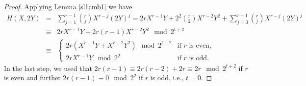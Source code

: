 \documentclass[11pt, reqno]{amsart}
\numberwithin{equation}{section}
\theoremstyle{definition}
\theoremstyle{remark}
\theoremstyle{definition}
\theoremstyle{remark}
\theoremstyle{remark}
\begin{document}
\begin{proof}
Applying Lemma \ref{sl1cmb1} we have 
\begin{eqnarray*}
    H(X,2Y)&=& \sum_{j=1}^{r-1}{r \choose j}X^{r-j}(2Y)^{j} = 2rX^{r-1}Y+ 2^2{r\choose 2}X^{r-2}Y^2+\sum_{j=3}^{r-1}{r \choose j}X^{r-j}(2Y)^{j}\\
    &\equiv & 2rX^{r-1}Y+ 2r(r-1)X^{r-2}Y^2 \mod2^{t+2}\\
    &\equiv& \begin{cases}
        2r(X^{r-1}Y+X^{r-2}Y^2)\mod 2^{t+2} & \text{if } r \text{ is even,}\\
        2rX^{r-1}Y \mod2^{2}& \text{if } r \text{ is odd.}\end{cases}
\end{eqnarray*} 
In the last step, we used that $2r(r-1)\equiv 2r(r-2)+2r\equiv 2r\mod2^{t+2}$ if $r$ is even and further $2r(r-1)\equiv 0\mod 2^{2}$ if $r$ is odd, i.e., $t=0$.


\end{proof}
\end{document}
